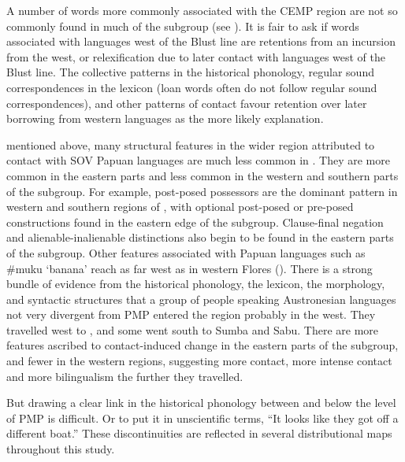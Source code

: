 A number of words more commonly associated with the CEMP region
are not so commonly found in much of the  subgroup (see ).
It is fair to ask if words associated with languages west of
the Blust line are retentions from an incursion from the west,
or relexification due to later contact with languages west of the Blust line.
The collective patterns in the historical phonology,
regular sound correspondences in the lexicon (loan words often
do not follow regular sound correspondences),
and other patterns of contact favour retention over later borrowing
from western languages as the more likely explanation.

 mentioned above, many structural features in the wider region
attributed to contact with SOV Papuan languages are much less common in .
They are more common in the eastern parts
and less common in the western
and southern parts of the subgroup.
For example, post-posed possessors are the dominant pattern in
western and southern regions of ,
with optional post-posed or pre-posed constructions found in
the eastern edge of the subgroup.
Clause-final negation and alienable-inalienable distinctions
also begin to be found in the eastern parts of the subgroup.
Other features associated with Papuan languages such as {\#}muku
‘banana’ reach as far west as  in western Flores
().
There is a strong bundle of evidence from the historical phonology,
the lexicon, the morphology,
and syntactic structures that a group of people speaking Austronesian
languages not very divergent from PMP entered the 
region probably in the west.
They travelled west to ,
and some went south to Sumba and Sabu.
There are more features ascribed to contact-induced change in
the eastern parts of the subgroup,
and fewer in the western regions,
suggesting more contact, more intense contact
and more bilingualism the further  they travelled.

But drawing a clear link in the historical phonology between
 and  below the level of PMP is difficult.
Or to put it in unscientific terms,
“It looks like they got off a different boat.” These discontinuities
are reflected in several distributional maps throughout this study.
